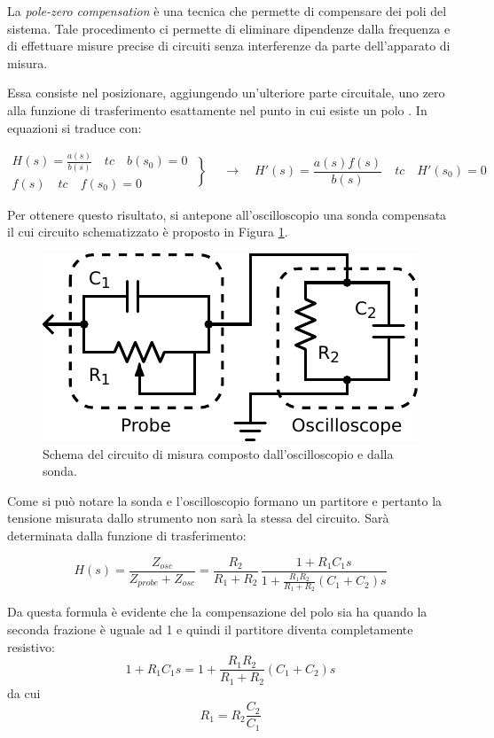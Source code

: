 La \textit{pole-zero compensation} è una tecnica che permette di compensare dei poli del sistema. Tale procedimento ci permette di eliminare dipendenze dalla frequenza e di effettuare misure precise di circuiti senza interferenze da parte dell'apparato di misura.

Essa consiste nel posizionare, aggiungendo un'ulteriore parte circuitale, uno zero alla funzione di trasferimento esattamente nel punto in cui esiste un polo .
In equazioni si traduce con:

\[
  \begin{array}{lr}
H(s) = \frac{a(s)}{b(s)} \quad tc \quad b(s_0) = 0 \\
f(s) \quad tc \quad f(s_0) = 0
  \end{array}\left\}
\quad \longrightarrow \quad H'(s) = \frac{a(s)f(s)}{b(s)} \quad tc \quad H'(s_0) = 0
\right.
\]

Per ottenere questo risultato, si antepone all'oscilloscopio una sonda compensata il cui circuito schematizzato è proposto in Figura \ref{cir8:probe}.

\begin{figure}
\centering
\includegraphics[width=.35\textwidth]{../E08/latex/probe.pdf}
\caption{Schema del circuito di misura composto dall'oscilloscopio e dalla sonda.}
\label{cir8:probe}
\end{figure}
Come si può notare la sonda e l'oscilloscopio formano un partitore e pertanto la tensione misurata dallo strumento non sarà la stessa del circuito.
Sarà determinata dalla funzione di trasferimento:

\begin{equation}
H(s)=\frac{Z_{osc}}{Z_{probe}+Z_{osc}} = \frac{R_2}{R_1+R_2}\,\frac{1+R_1C_1s}{1+\frac{R_1R_2}{R_1+R_2}(C_1+C_2)s}
\end{equation}

Da questa formula è evidente che la compensazione del polo sia ha quando la seconda frazione è uguale ad \num{1} e quindi il partitore diventa completamente resistivo:
\begin{equation*}
1+R_1C_1s = 1+\frac{R_1R_2}{R_1+R_2}(C_1+C_2)s
\end{equation*}
da cui
\begin{equation}
R_1 = R_2 \frac{C_2}{C_1}
\end{equation}

